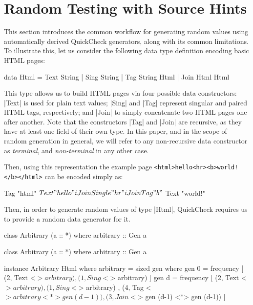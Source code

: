 \section{Random Testing with Source Hints}
\label{sec:sources}

This section introduces the common workflow for generating random values using
automatically derived QuickCheck generators, along with its common limitations.
%
To illustrate this, let us consider the following data type definition encoding
basic HTML pages:

\begin{code}
data Html
  =  Text  String
  |  Sing  String
  |  Tag   String Html
  |  Join  Html Html
\end{code}

This type allows us to build HTML pages via four possible data constructors:
|Text| is used for plain text values; |Sing| and |Tag| represent singular and
paired HTML tags, respectively; and |Join| to simply concatenate two HTML pages
one after another.
%
Note that the constructors |Tag| and |Join| are recursive, as they have at least
one field of their own type.
%
In this paper, and in the scope of random generation in general, we will refer
to any non-recursive data constructor as \emph{terminal}, and
\emph{non-terminal} in any other case.


Then, using this representation the example page\linebreak
%
\texttt{<html>hello<hr><b>world!</b></html>}
%
can be encoded simply as:
%
\begin{code}
Tag "html" $  Text "hello"
              iJoin Single "hr"
              iJoin Tag "b" $ Text "world!"
\end{code} %

Then, in order to generate random values of type |Html|, QuickCheck requires us
to provide a random data generator for it.

\begin{code}
class Arbitrary (a :: *) where
  arbitrary :: Gen a
\end{code}

\begin{code}
class Arbitrary (a :: *) where
  arbitrary :: Gen a
\end{code}

\begin{code}
instance Arbitrary Html where
  arbitrary = sized gen
    where
      gen 0 = frequency
        [  (2,  Text    <$> arbitrary)
        ,  (1,  Sing    <$> arbitrary) ]
      gen d = frequency
        [  (2,  Text    <$> arbitrary)
        ,  (1,  Sing    <$> arbitrary)
        ,  (4,  Tag     <$> arbitrary  <*> gen (d-1))
        ,  (3,  Join    <$> gen (d-1)  <*> gen (d-1)) ]
\end{code} %


